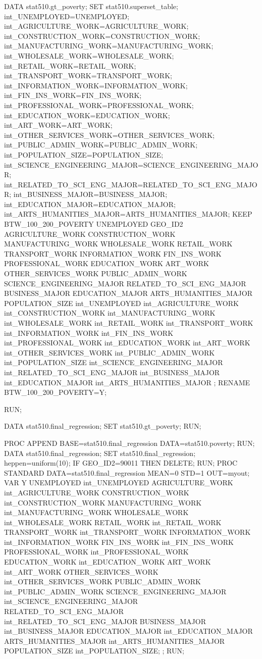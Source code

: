 \begin{SAScode}
DATA stat510.gt_poverty;
SET stat510.superset_table;
int_UNEMPLOYED=UNEMPLOYED;
int_AGRICULTURE_WORK=AGRICULTURE_WORK;
int_CONSTRUCTION_WORK=CONSTRUCTION_WORK;
int_MANUFACTURING_WORK=MANUFACTURING_WORK;
int_WHOLESALE_WORK=WHOLESALE_WORK;
int_RETAIL_WORK=RETAIL_WORK;
int_TRANSPORT_WORK=TRANSPORT_WORK;
int_INFORMATION_WORK=INFORMATION_WORK;
int_FIN_INS_WORK=FIN_INS_WORK;
int_PROFESSIONAL_WORK=PROFESSIONAL_WORK;
int_EDUCATION_WORK=EDUCATION_WORK;
int_ART_WORK=ART_WORK;
int_OTHER_SERVICES_WORK=OTHER_SERVICES_WORK;
int_PUBLIC_ADMIN_WORK=PUBLIC_ADMIN_WORK;
int_POPULATION_SIZE=POPULATION_SIZE;
int_SCIENCE_ENGINEERING_MAJOR=SCIENCE_ENGINEERING_MAJOR;
int_RELATED_TO_SCI_ENG_MAJOR=RELATED_TO_SCI_ENG_MAJOR;
int_BUSINESS_MAJOR=BUSINESS_MAJOR;
int_EDUCATION_MAJOR=EDUCATION_MAJOR;
int_ARTS_HUMANITIES_MAJOR=ARTS_HUMANITIES_MAJOR;
KEEP BTW_100_200_POVERTY
UNEMPLOYED
GEO_ID2
	AGRICULTURE_WORK
	CONSTRUCTION_WORK
	MANUFACTURING_WORK
	WHOLESALE_WORK
	RETAIL_WORK
	TRANSPORT_WORK
	INFORMATION_WORK
	FIN_INS_WORK
	PROFESSIONAL_WORK
	EDUCATION_WORK
	ART_WORK
	OTHER_SERVICES_WORK
	PUBLIC_ADMIN_WORK
	SCIENCE_ENGINEERING_MAJOR
	RELATED_TO_SCI_ENG_MAJOR
	BUSINESS_MAJOR
	EDUCATION_MAJOR
	ARTS_HUMANITIES_MAJOR
	POPULATION_SIZE
int_UNEMPLOYED
int_AGRICULTURE_WORK
int_CONSTRUCTION_WORK
int_MANUFACTURING_WORK
int_WHOLESALE_WORK
int_RETAIL_WORK
int_TRANSPORT_WORK
int_INFORMATION_WORK
int_FIN_INS_WORK
int_PROFESSIONAL_WORK
int_EDUCATION_WORK
int_ART_WORK
int_OTHER_SERVICES_WORK
int_PUBLIC_ADMIN_WORK
int_POPULATION_SIZE
int_SCIENCE_ENGINEERING_MAJOR
int_RELATED_TO_SCI_ENG_MAJOR
int_BUSINESS_MAJOR
int_EDUCATION_MAJOR
int_ARTS_HUMANITIES_MAJOR
;
RENAME BTW_100_200_POVERTY=Y;

RUN;

DATA stat510.final_regression;
SET stat510.gt_poverty;
RUN;

PROC APPEND BASE=stat510.final_regression DATA=stat510.poverty;
RUN;
DATA stat510.final_regression;
SET stat510.final_regression;
heppen=uniform(10);
IF GEO_ID2=90011 THEN DELETE;
RUN;
PROC STANDARD  DATA=stat510.final_regression MEAN=0 STD=1 OUT=myout;
VAR Y UNEMPLOYED int_UNEMPLOYED
AGRICULTURE_WORK int_AGRICULTURE_WORK
CONSTRUCTION_WORK int_CONSTRUCTION_WORK
MANUFACTURING_WORK int_MANUFACTURING_WORK
WHOLESALE_WORK int_WHOLESALE_WORK
RETAIL_WORK int_RETAIL_WORK
TRANSPORT_WORK int_TRANSPORT_WORK
INFORMATION_WORK int_INFORMATION_WORK
FIN_INS_WORK int_FIN_INS_WORK
PROFESSIONAL_WORK int_PROFESSIONAL_WORK
EDUCATION_WORK int_EDUCATION_WORK
ART_WORK int_ART_WORK
OTHER_SERVICES_WORK int_OTHER_SERVICES_WORK
PUBLIC_ADMIN_WORK int_PUBLIC_ADMIN_WORK
SCIENCE_ENGINEERING_MAJOR int_SCIENCE_ENGINEERING_MAJOR
RELATED_TO_SCI_ENG_MAJOR int_RELATED_TO_SCI_ENG_MAJOR
BUSINESS_MAJOR int_BUSINESS_MAJOR
EDUCATION_MAJOR int_EDUCATION_MAJOR
ARTS_HUMANITIES_MAJOR int_ARTS_HUMANITIES_MAJOR
POPULATION_SIZE int_POPULATION_SIZE;
;
RUN;	


\end{SAScode}
